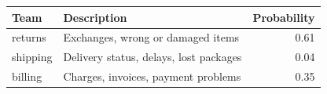 \setlength{\tabcolsep}{3pt}
\begin{tabular}{@{}llr@{}}
\toprule
Team & Description & Probability \\
\midrule
returns & Exchanges, wrong or damaged items & 0.61 \\
shipping & Delivery status, delays, lost packages & 0.04 \\
billing & Charges, invoices, payment problems & 0.35 \\
\bottomrule
\end{tabular}
